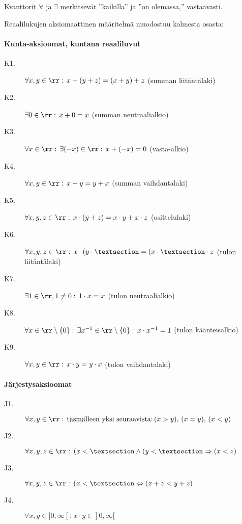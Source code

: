 Kvanttorit $\forall$ ja $\exists$ merkitsevät ''kaikilla'' ja ''on olemassa,'' vastaavasti.

Reaalilukujen aksiomaattinen määritelmä muodostuu kolmesta osasta:

\paragraph*{Kunta-aksioomat, kuntana reaaliluvut}
\begin{description}
\item[K1.] $\forall x, y \in \rr: \, x+(y+z) = (x+y)+z$ (summan liitäntälaki)
\item[K2.] $\exists 0 \in \rr: \, x+0 = x$ (summan neutraalialkio)
\item[K3.] $\forall x \in \rr: \, \exists (-x) \in \rr: \, x+(-x)=0$ (vasta-alkio)
\item[K4.] $\forall x, y \in \rr: \, x+y = y+x$ (summan vaihdantalaki)
\item[K5.] $\forall x, y, z \in \rr: \, x \cdot (y+z) = x \cdot y + x \cdot z$ (osittelulaki)
\item[K6.] $\forall x, y, z \in \rr: \, x \cdot (y \cdot
§ = (x \cdot
§ \cdot z$ (tulon liitäntälaki)
\item[K7.] $\exists 1 \in \rr, 1 \neq 0: \, 1 \cdot x = x$ (tulon neutraalialkio)
\item[K8.] $\forall x \in \rr \setminus \{0\}: \, \exists x^{-1} \in \rr \setminus \{0\}: \, x \cdot x^{-1}=1$ (tulon käänteisalkio)
\item[K9.] $\forall x, y \in \rr: \, x \cdot y = y \cdot x$ (tulon vaihdantalaki)
\end{description}

\paragraph*{Järjestysaksioomat}
\begin{description}
\item[J1.] $\forall x, y \in \rr: \, \text{täsmälleen yksi seuraavista:} \, (x > y), \, (x = y), \, (x < y)$
\item[J2.] $\forall x, y, z \in \rr: \, (x <
§ \land (y <
§ \Rightarrow (x < z)$
\item[J3.] $\forall x, y, z \in \rr: \, (x <
§ \Leftrightarrow (x + z < y + z)$
\item[J4.] $\forall x, y \in ]0,\infty[: \, x \cdot y \in ]0,\infty[$
\end{description}

